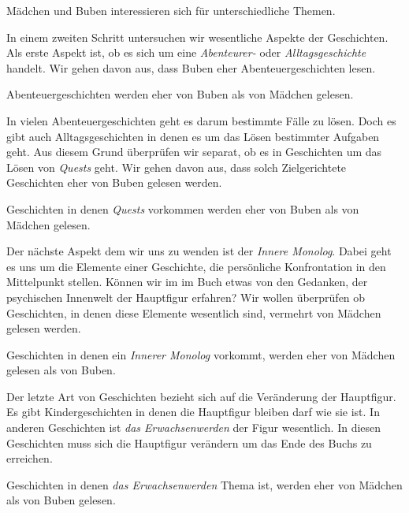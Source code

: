 \begin{hyp}\label{hyp:themen}
    Mädchen und Buben interessieren sich für unterschiedliche Themen.
\end{hyp}

In einem zweiten Schritt untersuchen wir wesentliche Aspekte der
Geschichten. Als erste Aspekt ist, ob es sich um eine \emph{Abenteurer-}
oder \emph{Alltagsgeschichte} handelt. Wir gehen davon aus, dass Buben
eher Abenteuergeschichten lesen.

\begin{subhyp}\label{h4.1}
   Abenteuergeschichten werden eher von Buben als von Mädchen gelesen.
\end{subhyp}

In vielen Abenteuergeschichten geht es darum bestimmte Fälle zu lösen.
Doch es gibt auch Alltagsgeschichten in denen es um das Lösen bestimmter
Aufgaben geht. Aus diesem Grund überprüfen wir separat, ob es in
Geschichten um das Lösen von \emph{Quests} geht. Wir gehen davon aus,
dass solch Zielgerichtete Geschichten eher von Buben gelesen werden.

\begin{subhyp}\label{h4.2}
    Geschichten in denen \emph{Quests} vorkommen werden eher von Buben als von Mädchen gelesen.
\end{subhyp}

Der nächste Aspekt dem wir uns zu wenden ist der \emph{Innere Monolog}.
Dabei geht es uns um die Elemente einer Geschichte, die persönliche
Konfrontation in den Mittelpunkt stellen. Können wir im im Buch etwas
von den Gedanken, der psychischen Innenwelt der Hauptfigur erfahren? Wir
wollen überprüfen ob Geschichten, in denen diese Elemente wesentlich
sind, vermehrt von Mädchen gelesen werden.

\begin{subhyp}\label{h4.3}
   Geschichten in denen ein \emph{Innerer Monolog} vorkommt, werden eher von Mädchen gelesen als von Buben.
\end{subhyp}

Der letzte Art von Geschichten bezieht sich auf die Veränderung der
Hauptfigur. Es gibt Kindergeschichten in denen die Hauptfigur bleiben
darf wie sie ist. In anderen Geschichten ist \emph{das Erwachsenwerden}
der Figur wesentlich. In diesen Geschichten muss sich die Hauptfigur
verändern um das Ende des Buchs zu erreichen.

\begin{subhyp}\label{h4.4}
   Geschichten in denen \emph{das Erwachsenwerden} Thema ist,
   werden eher von Mädchen als von Buben gelesen.
\end{subhyp}

